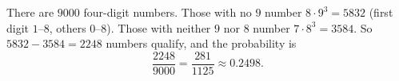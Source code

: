 There are $9000$ four-digit numbers. Those with no $9$ number $8\cdot9^3=5832$ (first digit $1$--$8$, others $0$--$8$). Those with neither $9$ nor $8$ number $7\cdot8^3=3584$. So $5832-3584=2248$ numbers qualify, and the probability is
\[\dfrac{2248}{9000}=\boxed{\dfrac{281}{1125}\approx0.2498}.\]
